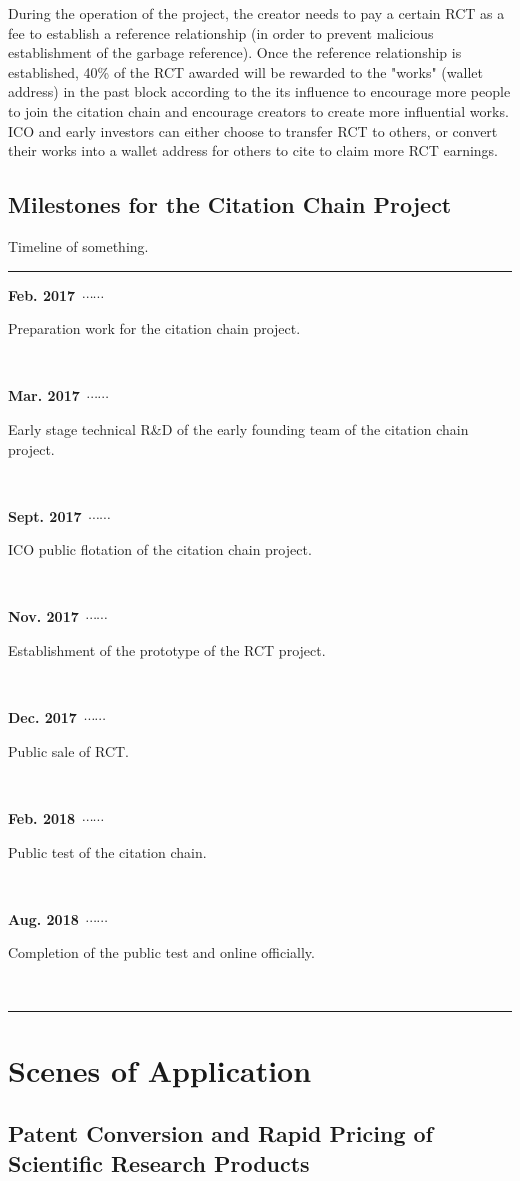 \documentclass[a4paper,oneside,openany]{tufte-book}
\newcommand\ytl[2]{
\parbox[b]{8em}{\hfill{\color{cyan}\bfseries\sffamily #1}~$\cdots\cdots$~}\makebox[0pt][c]{$\bullet$}\vrule\quad \parbox[c]{4.5cm}{\vspace{7pt}\color{red!40!black!80}\raggedright\sffamily #2.\\[7pt]}\\[-4pt]}
\begin{document}
During the operation of the project, the creator needs to pay a certain RCT as a fee to establish a reference relationship (in order to prevent malicious establishment of the garbage reference). Once the reference relationship is established, 40\% of the RCT awarded will be rewarded to the "works" (wallet address) in the past block according to the its influence to encourage more people to join the citation chain and encourage creators to create more influential works. ICO and early investors can either choose to transfer RCT to others, or convert their works into a wallet address for others to cite to claim more RCT earnings.

\section{Milestones for the Citation Chain Project}











\begin{table}
\caption{Timeline of something.}
\centering
\color{gray}
\rule{\linewidth}{1pt}
\ytl{Feb. 2017}{Preparation work for the citation chain project}
\ytl{Mar. 2017}{Early stage technical R\&D of the early founding team of the citation chain project}
\ytl{Sept. 2017}{ICO public flotation of the citation chain project}
\ytl{Nov. 2017}{Establishment of the prototype of the RCT project}
\ytl{Dec. 2017}{Public sale of RCT}
\ytl{Feb. 2018}{Public test of the citation chain}
\ytl{Aug. 2018}{Completion of the public test and online officially}
\bigskip
\rule{\linewidth}{1pt}%
\end{table}











\chapter{Scenes of Application}


\section{Patent Conversion and Rapid Pricing of Scientific Research Products}
\end{document}
